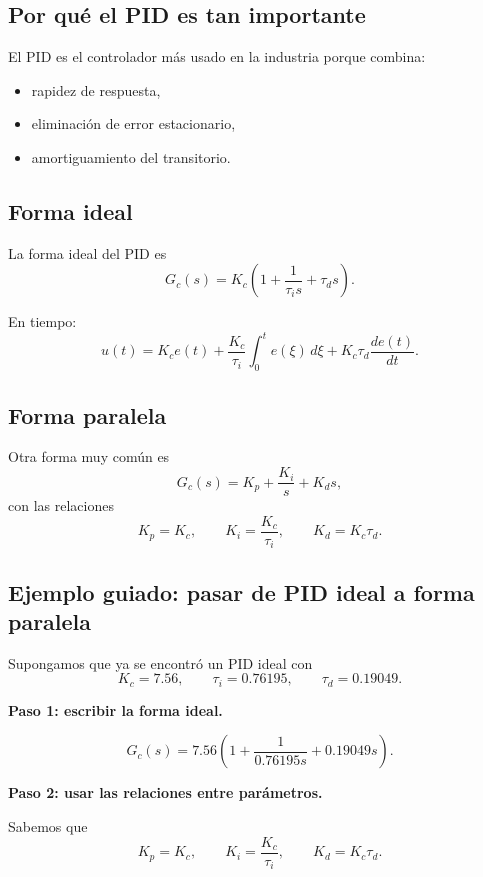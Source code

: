 \documentclass[11pt]{article}
\begin{document}
\subsection{Por qu\'e el PID es tan importante}
El PID es el controlador m\'as usado en la industria porque combina:
\begin{itemize}
\item rapidez de respuesta,
\item eliminaci\'on de error estacionario,
\item amortiguamiento del transitorio.
\end{itemize}

\subsection{Forma ideal}
La forma ideal del PID es
\begin{equation}
G_c(s)=K_c\left(1+\frac{1}{\tau_i s}+\tau_d s\right).
\label{eq:pidideal}
\end{equation}

En tiempo:
\begin{equation}
u(t)=K_c e(t)+\frac{K_c}{\tau_i}\int_0^t e(\xi)\,d\xi+K_c\tau_d \frac{de(t)}{dt}.
\end{equation}

\subsection{Forma paralela}
Otra forma muy com\'un es
\begin{equation}
G_c(s)=K_p+\frac{K_i}{s}+K_d s,
\end{equation}
con las relaciones
\begin{equation}
K_p=K_c,\qquad K_i=\frac{K_c}{\tau_i},\qquad K_d=K_c\tau_d.
\end{equation}

\subsection{Ejemplo guiado: pasar de PID ideal a forma paralela}
Supongamos que ya se encontr\'o un PID ideal con
\[
K_c=7.56,\qquad \tau_i=0.76195,\qquad \tau_d=0.19049.
\]

\textbf{Paso 1: escribir la forma ideal.}

\[
G_c(s)=7.56\left(1+\frac{1}{0.76195s}+0.19049s\right).
\]

\textbf{Paso 2: usar las relaciones entre par\'ametros.}

Sabemos que
\[
K_p=K_c,\qquad K_i=\frac{K_c}{\tau_i},\qquad K_d=K_c\tau_d.
\]
\end{document}
